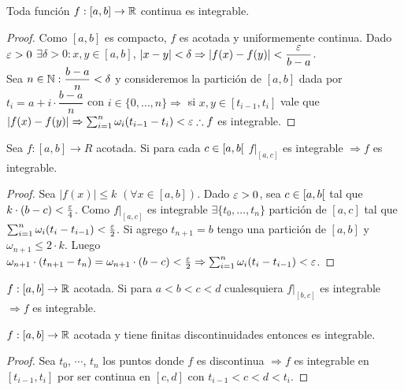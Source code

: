 \begin{theorem}
  Toda función \(f : [a, b] \to \mathbb{R} \) continua es integrable.
  \begin{proof}
    Como \([a, b]\) es compacto, \(f\) es acotada y uniformemente continua. Dado \(\varepsilon > 0\) \(\exists \delta > 0 : x, y \in [a, b]\), \(|x-y| < \delta \Rightarrow |f(x) - f(y)| < \dfrac{\varepsilon}{b-a} \). \\
    Sea \(n \in \mathbb{N} : \dfrac{b-a}{n} < \delta \) y consideremos la partición de \([a, b]\) dada por \(t_i = a + i \cdot \dfrac{b-a}{n} \) con \(i \in \{0, \ldots, n\} \Rightarrow \) si \(x, y \in [t_{i-1}, t_i]\) vale que \(|f(x) - f(y)| \Rightarrow \sum_{i=1}^n \omega_i (t_{i-1} - t_i) < \varepsilon \therefore f\) es integrable.
  \end{proof}
\end{theorem}

\begin{theorem}
  Sea \(f: [a, b] \to R\) acotada. Si para cada \(c \in \interval[open right]{a}{b}\) \(f|_{[a, c]} \) es integrable \(\Rightarrow f\) es integrable.
  \begin{proof}
    Sea \(|f(x)| \leq k\) \((\forall x \in [a,b])\). Dado \(\varepsilon > 0\), sea \(c \in \interval[open right]{a}{b}\) tal que \(k \cdot (b-c) < \frac{\varepsilon}{4} \). Como \( f|_{[a, c]} \) es integrable \(\exists \{t_0, \ldots, t_n\} \) partición de \([a, c]\) tal que \(\sum_{i = 1}^n \omega_i (t_i - t_{i-1}) < \frac{\varepsilon}{2} \). Si agrego \(t_{n+1} = b\) tengo una partición de \([a, b]\) y \(\omega_{n+1} \leq 2 \cdot k\). Luego \(\omega_{n+1} \cdot (t_{n+1} - t_n) = \omega_{n+1} \cdot (b-c) < \frac{\varepsilon}{2} \Rightarrow \sum_{i = 1}^n \omega_i (t_i - t_{i-1}) < \varepsilon \).
  \end{proof}
\end{theorem}

\begin{corollary}
  \(f: [a, b] \to \mathbb{R} \) acotada. Si para \(a < b < c < d\) cualesquiera \(f|_{[b, c]} \) es integrable \(\Rightarrow f\) es integrable.
\end{corollary}

\begin{corollary}
  \(f: [a, b] \to \mathbb{R} \) acotada y tiene finitas discontinuidades entonces es integrable.
  \begin{proof}
    Sea \(t_0\), \(\cdots \), \(t_n\) los puntos donde \(f\) es discontinua \(\Rightarrow f\) es integrable en \([t_{i-1}, t_i]\) por ser continua en \([c, d]\) con \(t_{i-1} < c < d < t_i\).
  \end{proof}
\end{corollary}

